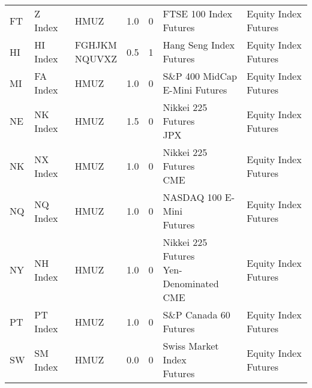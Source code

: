 \begin{longtable}{lllrrll}
                   FT &                Z Index &                      HMUZ &                               1.0 &                        0 &                         \makecell{FTSE 100 Index\\Futures} &    Equity Index Futures \\
                   HI &               HI Index & \makecell{FGHJKM\\NQUVXZ} &                               0.5 &                        1 &                        \makecell{Hang Seng Index\\Futures} &    Equity Index Futures \\
                   MI &               FA Index &                      HMUZ &                               1.0 &                        0 &                 \makecell{S\&P 400 MidCap\\E-Mini Futures} &    Equity Index Futures \\
                   NE &               NK Index &                      HMUZ &                               1.5 &                        0 &                         \makecell{Nikkei 225 Futures\\JPX} &    Equity Index Futures \\
                   NK &               NX Index &                      HMUZ &                               1.0 &                        0 &                         \makecell{Nikkei 225 Futures\\CME} &    Equity Index Futures \\
                   NQ &               NQ Index &                      HMUZ &                               1.0 &                        0 &                      \makecell{NASDAQ 100 E-Mini\\Futures} &    Equity Index Futures \\
                   NY &               NH Index &                      HMUZ &                               1.0 &                        0 &         \makecell{Nikkei 225 Futures\\Yen-Denominated CME} &    Equity Index Futures \\
                   PT &               PT Index &                      HMUZ &                               1.0 &                        0 &                         \makecell{S\&P Canada 60\\Futures} &    Equity Index Futures \\
                   SW &               SM Index &                      HMUZ &                               0.0 &                        0 &                     \makecell{Swiss Market Index\\Futures} &    Equity Index Futures \\

\end{longtable}

